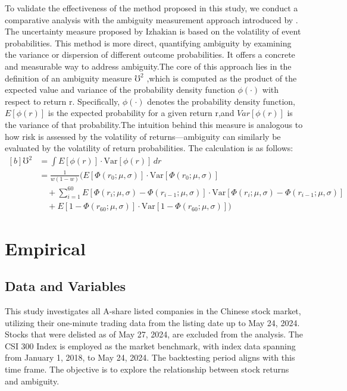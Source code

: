 \documentclass[preprint,12pt,authoryear]{elsarticle}
\begin{document}
To validate the effectiveness of the method proposed in this study, we conduct a comparative analysis with the ambiguity measurement approach introduced by \cite{izhakian2020}. The uncertainty measure proposed by Izhakian is based on the volatility of event probabilities. This method is more direct, quantifying ambiguity by examining the variance or dispersion of different outcome probabilities. It offers a concrete and measurable way to address ambiguity.The core of this approach lies in the definition of an ambiguity measure $\mho^2$ ,which is computed as the product of the expected value and variance of the probability density function $\phi(\cdot)$ with respect to return r. Specifically, $\phi(\cdot)$
denotes the probability density function, $E[\phi(r)]$ is the expected probability for a given return r,and $Var[\phi(r)]$ is the variance of that probability.The intuition behind this measure is analogous to how risk is assessed by the volatility of returns—ambiguity can similarly be evaluated by the volatility of return probabilities. The calculation is as follows:
\begin{equation}
\begin{aligned}[b]
\mho^2 &= \int E[\phi(r)] \cdot \text{Var}[\phi(r)] \, dr \\
       &= \frac{1}{w(1-w)} \bigg( E[\Phi(r_0;\mu,\sigma)] \cdot \text{Var}[\Phi(r_0;\mu,\sigma)] \\
       &\quad + \sum_{i=1}^{60} E[\Phi(r_i;\mu,\sigma) - \Phi(r_{i-1};\mu,\sigma)] \cdot \text{Var}[\Phi(r_i;\mu,\sigma) - \Phi(r_{i-1};\mu,\sigma)] \\
       &\quad + E[1-\Phi(r_{60};\mu,\sigma)] \cdot \text{Var}[1-\Phi(r_{60};\mu,\sigma)] \bigg)
\end{aligned}
\end{equation}


\section{Empirical}
\label{sec:empirical}

\subsection{Data and Variables}

This study investigates all A-share listed companies in the Chinese stock market, utilizing their one-minute trading data from the listing date up to May 24, 2024. Stocks that were delisted as of May 27, 2024, are excluded from the analysis. The CSI 300 Index is employed as the market benchmark, with index data spanning from January 1, 2018, to May 24, 2024. The backtesting period aligns with this time frame. The objective is to explore the relationship between stock returns and ambiguity.
\end{document}
